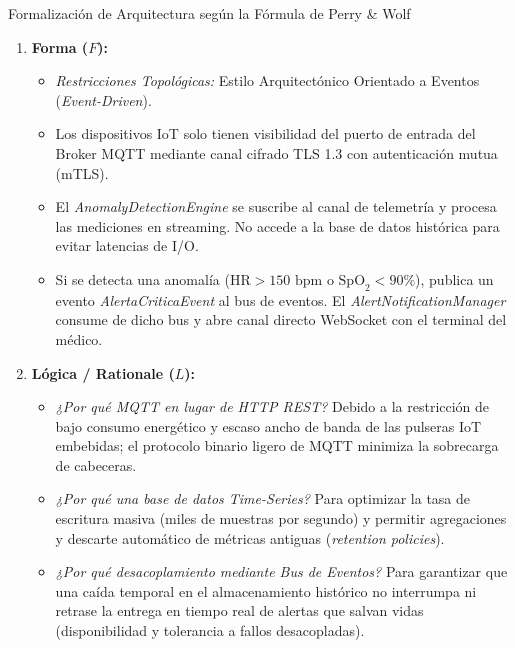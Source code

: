 \begin{ejercicioresuelto}{Formalización de Arquitectura según la Fórmula de Perry \& Wolf}
\begin{enumerate}[leftmargin=1.5em]
  \item \textbf{Forma ($F$):}
    \begin{itemize}
      \item \emph{Restricciones Topológicas:} Estilo Arquitectónico Orientado a Eventos (\emph{Event-Driven}).
      \item Los dispositivos IoT solo tienen visibilidad del puerto de entrada del Broker MQTT mediante canal cifrado TLS 1.3 con autenticación mutua (mTLS).
      \item El \emph{AnomalyDetectionEngine} se suscribe al canal de telemetría y procesa las mediciones en streaming. No accede a la base de datos histórica para evitar latencias de I/O.
      \item Si se detecta una anomalía ($\text{HR} > 150 \text{ bpm}$ o $\text{SpO}_2 < 90\%$), publica un evento \emph{AlertaCriticaEvent} al bus de eventos. El \emph{AlertNotificationManager} consume de dicho bus y abre canal directo WebSocket con el terminal del médico.
    \end{itemize}

  \item \textbf{Lógica / Rationale ($L$):}
    \begin{itemize}
      \item \emph{¿Por qué MQTT en lugar de HTTP REST?} Debido a la restricción de bajo consumo energético y escaso ancho de banda de las pulseras IoT embebidas; el protocolo binario ligero de MQTT minimiza la sobrecarga de cabeceras.
      \item \emph{¿Por qué una base de datos Time-Series?} Para optimizar la tasa de escritura masiva (miles de muestras por segundo) y permitir agregaciones y descarte automático de métricas antiguas (\emph{retention policies}).
      \item \emph{¿Por qué desacoplamiento mediante Bus de Eventos?} Para garantizar que una caída temporal en el almacenamiento histórico no interrumpa ni retrase la entrega en tiempo real de alertas que salvan vidas (disponibilidad y tolerancia a fallos desacopladas).
    \end{itemize}
\end{enumerate}
\end{ejercicioresuelto}

